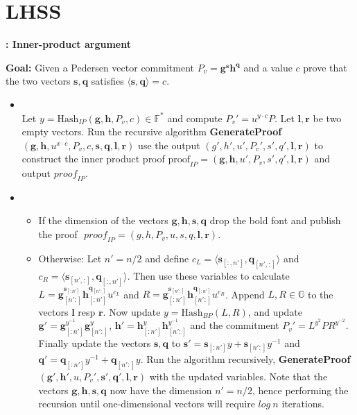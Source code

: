 \chapter{LHSS}
\label{App:innerP}

\begin{algorithm}
\caption{\textbf{: Inner-product argument}}
\textbf{Goal:} Given a Pedersen vector  commitment $P_v=\bm{g}^{\bm{s}} \bm{h}^{\bm{q}}$ and a value $c$ prove that the two vectors $\bm{s},\bm{q}$ satisfies $\langle\bm{s},\bm{q}\rangle=c$.
\vspace{2pt}
\hline
\vspace{2pt}
\begin{itemize}
\item{}\\
Let $y=\text{Hash}_{IP}(\mathbf{g},\mathbf{h},P_v,c) \in\mathds{F}^*$ and compute $P_v'= u^{y\cdot c}P$. Let $\mathbf{l},\mathbf{r}$ be two empty vectors. Run the recursive algorithm \textbf{GenerateProof}$(\mathbf{g},\mathbf{h},u^{x\cdot c},P_v,c,\mathbf{s},\mathbf{q},\mathbf{l},\mathbf{r})$ use the output $(g',h',u',P_v',s',q',\mathbf{l},\mathbf{r})$ to construct the inner product proof $\text{proof}_{IP} =(\mathbf{g},\mathbf{h},u',P_v,s',q',\mathbf{l},\mathbf{r} )$ and output $\textit{proof}_{IP}$. 
\item{}
\begin{itemize}
    \item If the dimension of the vectors $\mathbf{g},\mathbf{h},\mathbf{s},\mathbf{q}$  drop the bold font and publish the proof $\textit{ proof}_{IP}=(g,h,P_v,u,s,q,\mathbf{l},\mathbf{r})$.
    \item  Otherwise:  Let $n'=n/2$ and define  $c_L=\langle \bm{s}_{[:,n']},\bm{q}_{[n',:]} \rangle$ and $c_R=\langle \mathbf{s}_{[n',:]},\mathbf{q}_{[:,n']} \rangle$. Then use these variables to calculate $L=\mathbf{g}_{[n':]}^{\mathbf{s}_{[:n']}} \mathbf{h}_{[:n']}^{\mathbf{q}_{[n':]}} u^{c_L}$ and $R=\mathbf{g}_{[:n']}^{\mathbf{s}_{[n':]}} \mathbf{h}_{[n':]}^{\mathbf{q}_{[:n']}} u^{c_R}$. Append  $L,R\in\mathds{G}$ to the vectors $\mathbf{l}$ resp $\mathbf{r}$. Now update $y=\text{Hash}_{BP}(L,R)$, and update $\mathbf{g}' = \mathbf{g}_{[:n']}^{y^{-1}}\mathbf{g}_{[n':]}^{y}$, $\mathbf{h}' = \mathbf{h}_{[:n']}^{y}\mathbf{h}_{[n':]}^{y^{-1}}$ and the commitment $P_v'=L^{y^2}PR^{y^{-2}}$. Finally update the vectors $\mathbf{s},\mathbf{q}$ to $\mathbf{s}' = \mathbf{s}_{[:n']}y+\mathbf{s}_{[n':]}y^{-1}$ and $\mathbf{q}' = \mathbf{q}_{[:n']}y^{-1}+\mathbf{q}_{[n':]}y$. Run the algorithm recursively, \textbf{GenerateProof}$(\mathbf{g}',\mathbf{h}',u,P_v',\mathbf{s}',\mathbf{q}',\mathbf{l},\mathbf{r})$ with the updated variables. Note that the vectors $\mathbf{g},\mathbf{h},\mathbf{s},\mathbf{q}$ now have the dimension $n'=n/2$, hence performing the recursion until one-dimensional vectors will require $log\:n$ iterations.

\end{itemize}
\end{itemize}
\end{algorithm}
